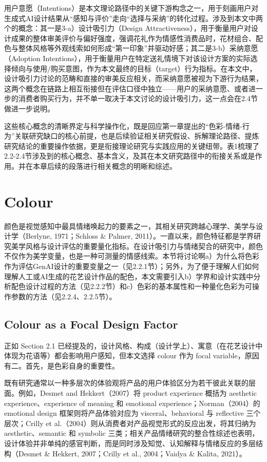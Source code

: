 用户意愿（Intentions）是本文理论路径中的关键下游构念之一，用于刻画用户对生成式AI设计结果从“感知与评价”走向“选择与采纳”的转化过程。涉及到本文中两个的概念：其一是3-a）设计吸引力（Design Attractiveness），用于衡量用户对设计成果的整体审美评价与偏好强度，强调花礼作为情感性消费品时，花材组合、配色与整体风格等外观线索如何形成“第一印象”并驱动好感；其二是3-b）采纳意愿（Adoption Intentions），用于衡量用户在特定送礼情境下对该设计方案的实际选择倾向与使用/购买意图，作为本文最终的目标（target）行为指标。在本文中，设计吸引力讨论的范畴和直接的审美反应相关，而采纳意愿被视为下游行为结果，这两个概念在链路上相互衔接但在评估口径中独立——用户的采纳意愿、或者进一步的消费者购买行为，并不单一取决于本文讨论的设计吸引力，这一点会在2.4节做进一步说明。

这些核心概念的清晰界定与科学操作化，既是回应第一章提出的“色彩-情绪-行为”关联研究缺口的核心前提，也是后续验证相关研究假设、拆解理论路径、提炼研究结论的重要操作依据，更是衔接理论研究与实践应用的关键纽带。表1梳理了2.2-2.4节涉及到的核心概念、基本含义，及其在本文研究路径中的衔接关系或是作用。并在本章后续的段落进行相关概念的明晰和综述。


\section{Colour}

颜色是视觉感知中最具情绪唤起力的要素之一，其相关研究跨越心理学、美学与设计学（Berlyne, 1971；Schloss \& Palmer, 2011）。一直以来，颜色特征都是学界研究美学风格与设计评估的重要量化指标。在设计吸引力与情绪契合的研究中，颜色不仅作为美学变量，也是一种可测量的情感线索。本节将讨论啊a）为什么将色彩作为评估GenAI设计的重要变量之一（见2.2.1节）；另外，为了便于理解人们如何理解人工或AI生成的花艺设计作品的配色，本文需要引入b）学界和设计实践中分析配色设计过程的方法（见2.2.2节）和c）色彩的基本属性和一种量化色彩为可操作参数的方法（见2.2.4、2.2.5节）。

\subsection{Colour as a Focal Design Factor}

正如 Section 2.1 已经提及的，设计风格、构成（设计学上）、寓意（在花艺设计中体现为花语等）都会影响用户感知，但本文选择 colour 作为 focal variable，原因有二。首先，是色彩自身的重要性。

既有研究通常以一种多层次的体验观将产品的用户体验区分为若干彼此关联的层面。例如，Desmet and Hekkert（2007）将 product experience 概括为 aesthetic experience、experience of meaning 和 emotional experience；Norman（2004）的 emotional design 框架则将产品体验对应为 visceral、behavioral 与 reflective 三个层次；Crilly et al.（2004）则从消费者对产品视觉形式的反应出发，将其归纳为 aesthetic、semantic 和 symbolic 三类；相关产品情绪研究的整合性综述也表明，设计体验并非单纯的感官判断，而是同时涉及知觉、认知解释与情绪反应的多层结构（Desmet \& Hekkert, 2007；Crilly et al., 2004；Vaidya \& Kalita, 2021）。

